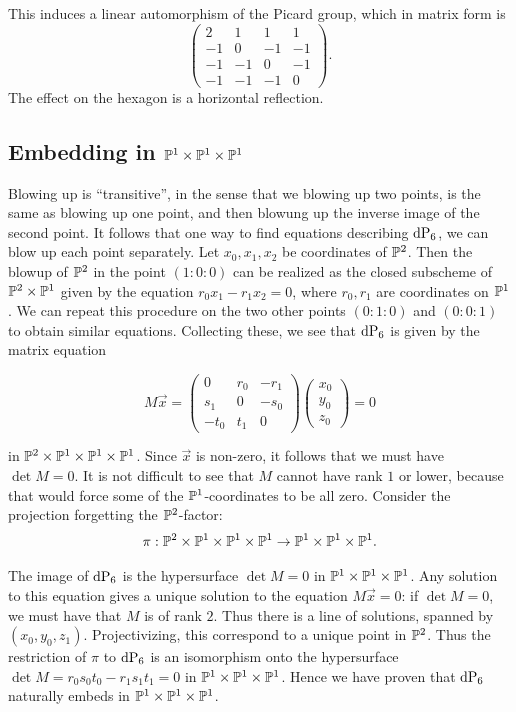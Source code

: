 This induces a linear automorphism of the Picard group, which in matrix form is
\[
\begin{pmatrix}
2 & 1 & 1 & 1 \\
-1& 0 & -1 &-1 \\
-1& -1 & 0 &-1 \\
-1& -1 & -1 &0
\end{pmatrix}.
\]
The effect on the hexagon is a horizontal reflection.

\subsection{Embedding in $\P^1 \times \P^1 \times \P^1$}
\label{sec:emb_p1p1p1}

Blowing up is ``transitive'', in the sense that we blowing up two points, is the same as blowing up one point, and then blowung up the inverse image of the second point. It follows that one way to find equations describing $\dP6$, we can blow up each point separately. Let $x_0,x_1,x_2$ be coordinates of $\P^2$. Then the blowup of $\P^2$ in the point $(1:0:0)$ can be realized as the closed subscheme of $\P^2 \times \P^1$ given by the equation $r_0x_1-r_1x_2=0$, where $r_0,r_1$ are coordinates on $\P^1$. We can repeat this procedure on the two other points $(0:1:0)$ and $(0:0:1)$ to obtain similar equations. Collecting these, we see that $\dP6$ is given by the matrix equation

\[
M\vec x = 
\begin{pmatrix}
0 & r_0 & -r_1 \\
s_1 & 0 & -s_0 \\
-t_0 & t_1 & 0
\end{pmatrix}
\begin{pmatrix}
x_0 \\ y_0 \\ z_0
\end{pmatrix}= 0
\]

in $\P^2 \times \P^1 \times \P^1 \times \P^1$. Since $\vec x$ is non-zero, it follows that we must have $\det M = 0$. It is not difficult to see that $M$ cannot have rank $1$ or lower, because that would force some of the $\P^1$-coordinates to be all zero. Consider the projection forgetting the $\P^2$-factor:
$$
\pi:\P^2 \times \P^1 \times \P^1 \times \P^1 \to \P^1 \times \P^1 \times \P^1.
$$

The image of $\dP6$ is the hypersurface $\det M = 0$ in $\P^1 \times \P^1 \times \P^1$. Any solution to this equation gives a unique solution to the equation $M \vec x = 0$: if $\det M = 0$, we must have that $M$ is of rank $2$. Thus there is a line of solutions, spanned by $(x_0,y_0,z_1)$. Projectivizing, this correspond to a unique point in $\P^2$. Thus the restriction of $\pi$ to $\dP6$ is an isomorphism onto the hypersurface $\det M=r_0s_0t_0-r_1s_1t_1=0$ in $\P^1 \times \P^1 \times \P^1$. Hence we have proven that $\dP6$ naturally embeds in $\P^1 \times \P^1 \times \P^1$. 

